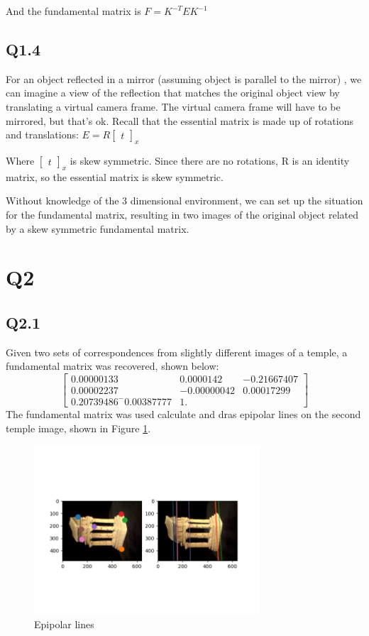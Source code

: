 \documentclass[12pt]{article}
\begin{document}
And the fundamental matrix is $F = K^{-T} E K^{-1}$ 

\newpage
\subsection{Q1.4}
For an object reflected in a mirror (assuming object is parallel to the mirror) , we can imagine a view of the reflection that matches the original object view by translating a virtual camera frame. The virtual camera frame will have to be mirrored, but that's ok.
Recall that the essential matrix is made up of rotations and translations:
$E = R \begin{bmatrix} t \end{bmatrix}_{x}$ 

Where $\begin{bmatrix} t \end{bmatrix}_{x}$ is skew symmetric. Since there are no rotations, R is an identity matrix, so the essential matrix is skew symmetric.

Without knowledge of the 3 dimensional environment, we can set up the situation for the fundamental matrix, resulting in two images of the original object related by a skew symmetric fundamental matrix.


\newpage
\section{Q2}
\subsection{Q2.1}
Given two sets of correspondences from slightly different images of a temple, a fundamental matrix was recovered, shown below:
$$
\begin{bmatrix}
0.00000133  &  0.0000142  &  -0.21667407 \\
0.00002237  & -0.00000042 &  0.00017299 \\
0.20739486  ^ -0.00387777 &   1.         
\end{bmatrix}
$$
The fundamental matrix was used calculate and dras epipolar lines on the second temple image, shown in Figure \ref{fig:fepipolar}.

\begin{figure}[H]
\centering
\includegraphics[page=1,width=0.75\textwidth]{q2_1}
\caption{ Epipolar lines  } 
\label{fig:fepipolar}
\end{figure}   
\end{document}
